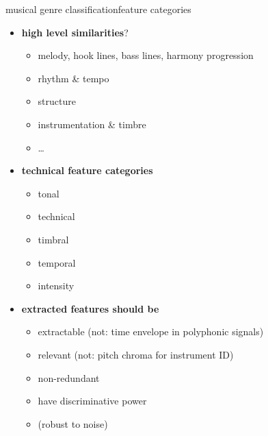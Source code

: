         \begin{frame}{musical genre classification}{feature categories}
            \vspace{-3mm}
            \begin{itemize}
                \item	\textbf{high level similarities}?
                    \begin{itemize}
                        \item	melody, hook lines, bass lines, harmony progression
                        \item	rhythm \& tempo
                        \item	structure
                        \item	instrumentation \& timbre
                        \item	\ldots
                    \end{itemize}
                \smallskip
                \item<2->	\textbf{technical feature categories}
                    \begin{itemize}
                        \item	tonal
                        \item	technical
                        \item	timbral
                        \item	temporal
                        \item	intensity
                    \end{itemize}
                \smallskip
                \item<3->       \textbf{extracted features should be}
                    \begin{itemize}
                        \item   extractable (not: time envelope in polyphonic signals)
                        \item   relevant (not: pitch chroma for instrument ID)
                        \item   non-redundant
                        \item   have discriminative power
                        \item   (robust to noise)
                    \end{itemize}
            \end{itemize}
        \end{frame}

